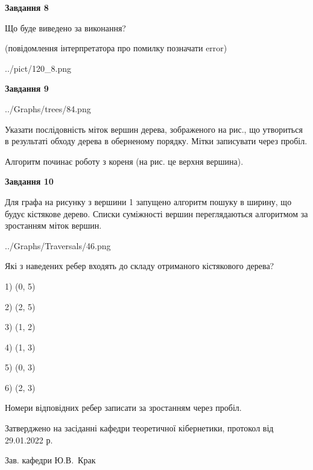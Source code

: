 \documentclass[12pt, ukrainian]{article}
\begin{document}
{\begin {large}
{\begin {center}\textbf{Завдання 8}\end {center}}\par
Що буде виведено за виконання?\par
 (повідомлення інтерпретатора про помилку позначати error)\par
\begin{center}
	{../pict/120_8.png}
\end{center}
\newpage

{\begin {center}\textbf{Завдання 9}\end {center}}\par

\begin{center}
	{../Graphs/trees/84.png}
\end{center}
Указати послідовність міток вершин дерева, зображеного на рис., що утвориться в результаті обходу дерева в оберненому порядку. Мітки записувати через пробіл.\par Алгоритм починає роботу з кореня (на рис. це верхня вершина).\par
\newpage

{\begin {center}\textbf{Завдання 10}\end {center}}\par
Для графа на рисунку з вершини 1 запущено алгоритм пошуку в ширину, що будує кістякове дерево. Списки суміжності вершин переглядаються алгоритмом за зростанням міток вершин.\par
\begin{center}
	{../Graphs/Traversals/46.png}
\end{center}
\par Які з наведених ребер входять до складу отриманого кістякового дерева?\par
1) (0, 5)\par
2) (2, 5)\par
3) (1, 2)\par
4) (1, 3)\par
5) (0, 3)\par
6) (2, 3)\par
{\vskip 15pt} Номери відповідних ребер записати за зростанням через пробіл.\par
\newpage


\end {large}
}
{\smallskip \begin {small} Затверджено на засіданні кафедри теоретичної кібернетики, протокол  від   29.01.2022 р.\par\smallskip\smallskip
{\parbox {6.5 cm}{Зав. кафедри \dotfill Ю.В.~Крак}} \end{small}}
\end{document}
